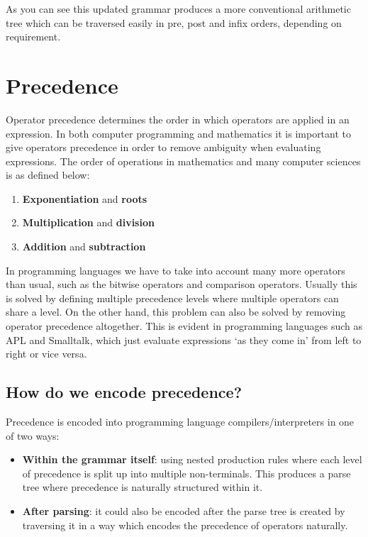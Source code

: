 As you can see this updated grammar produces a more conventional arithmetic tree which can be traversed easily in pre, post and infix orders, depending on requirement.

\section{Precedence}
\label{sec:precedence}

Operator precedence determines the order in which operators are applied in an expression. In both computer programming and mathematics it is important to give operators precedence in order to remove ambiguity when evaluating expressions. The order of operations in mathematics and many computer sciences is as defined below:

\begin{center}
    \begin{enumerate}
        \item \textbf{Exponentiation} and \textbf{roots}
        \item \textbf{Multiplication} and \textbf{division}
        \item \textbf{Addition} and \textbf{subtraction}
    \end{enumerate}
\end{center}

In programming languages we have to take into account many more operators than usual, such as the bitwise operators and comparison operators. Usually this is solved by defining multiple precedence levels where multiple operators can share a level. On the other hand, this problem can also be solved by removing operator precedence altogether. This is evident in programming languages such as APL and Smalltalk, which just evaluate expressions `as they come in' from left to right or vice versa.\textsuperscript{\cite{winkle_2021}}

\subsection{How do we encode precedence?}

Precedence is encoded into programming language compilers/interpreters in one of two ways:

\begin{itemize}
    \item \textbf{Within the grammar itself}: using nested production rules where each level of precedence is split up into multiple non-terminals. This produces a parse tree where precedence is naturally structured within it.
    \item \textbf{After parsing}: it could also be encoded after the parse tree is created by traversing it in a way which encodes the precedence of operators naturally.
\end{itemize}

